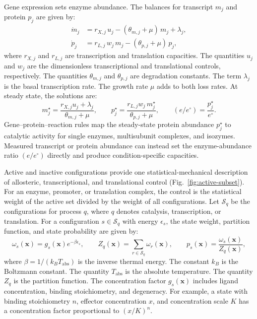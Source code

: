Gene expression sets enzyme abundance. The balances for transcript $m_j$ and
protein $p_j$ are given by:
\begin{align}
  \dot m_j &= r_{X,j}\,u_j - (\theta_{m,j}+\mu)\,m_j + \lambda_j,
  \label{eq:mrna}\\
  \dot p_j &= r_{L,j}\,w_j\,m_j - (\theta_{p,j}+\mu)\,p_j,
  \label{eq:protein}
\end{align}
where $r_{X,j}$ and $r_{L,j}$ are transcription and translation
capacities. The quantities $u_j$ and $w_j$ are the dimensionless
transcriptional and translational controls, respectively. The quantities
$\theta_{m,j}$ and $\theta_{p,j}$ are degradation constants. The term
$\lambda_j$ is the basal transcription rate. The growth rate $\mu$ adds to
both loss rates. At steady state, the solutions are:
\begin{equation}\label{eq:expression-ss}
  m^{\star}_j = \frac{r_{X,j}u_j+\lambda_j}{\theta_{m,j}+\mu},
  \qquad
  p^{\star}_j = \frac{r_{L,j}w_j\,m^{\star}_j}{\theta_{p,j}+\mu},
  \qquad
  (e/e^{\circ}) = \frac{p^{\star}_j}{e^{\circ}}.
\end{equation}
Gene--protein--reaction rules map the steady-state protein abundance
$p_j^\star$ to catalytic activity for single enzymes, multisubunit complexes,
and isozymes. Measured transcript or protein abundance can instead set the
enzyme-abundance ratio $(e/e^{\circ})$ directly and produce condition-specific
capacities.

Active and inactive configurations provide one statistical-mechanical
description of allosteric, transcriptional, and translational control
(Fig.~\ref{fig:active-subset}). For an enzyme, promoter, or translation
complex, the
control is the statistical weight of the active set divided by the weight of
all configurations. Let $\mathcal S_q$ be the configurations for process $q$,
where $q$ denotes
catalysis, transcription, or translation. For a configuration
$s\in\mathcal S_q$ with energy $\epsilon_s$, the state weight, partition
function, and state probability are given by:
\begin{equation}\label{eq:partition}
  \omega_s(\mathbf x)
    = g_s(\mathbf x)e^{-\beta\epsilon_s},
  \qquad
  Z_q(\mathbf x)
    = \sum_{r\in\mathcal S_q}\omega_r(\mathbf x),
  \qquad
  p_s(\mathbf x)
    = \frac{\omega_s(\mathbf x)}{Z_q(\mathbf x)},
\end{equation}
where $\beta=1/(k_BT_{\mathrm{abs}})$ is the inverse thermal energy.
The constant $k_B$ is the Boltzmann constant. The quantity $T_{\mathrm{abs}}$
is the absolute temperature. The quantity $Z_q$ is the partition function. The concentration factor
$g_s(\mathbf x)$ includes ligand concentration, binding stoichiometry, and
degeneracy. For example, a state with binding stoichiometry $n$, effector
concentration $x$, and concentration scale $K$ has a concentration factor
proportional to $(x/K)^n$.

